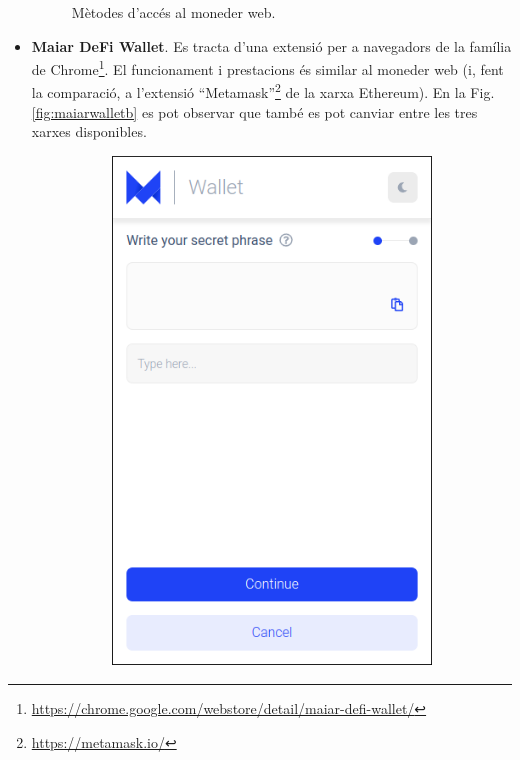 \documentclass[11pt,a4paper]{article}
\begin{document}
\begin{itemize}
\begin{figure}[h]
\centering
\caption{Mètodes d'accés al moneder web.}\label{fig:webwallet}
\end{figure} 
\item \textbf{Maiar DeFi Wallet}. Es tracta d'una extensió per a navegadors de la família de Chrome\footnote{\url{https://chrome.google.com/webstore/detail/maiar-defi-wallet/}}. El funcionament i prestacions és similar al moneder web (i, fent la comparació, a l'extensió ``Metamask''\footnote{\url{https://metamask.io/}} de la xarxa Ethereum). En la Fig. \ref{fig:maiarwalletb} es pot observar que també es pot canviar entre les tres xarxes disponibles.
\begin{figure}[!htb]
\begin{subfigure}[b]{0.4\textwidth}
  \includegraphics[width=\linewidth]{maiarextensio.png}

\end{subfigure}
\end{figure}
\end{itemize}
\end{document}

